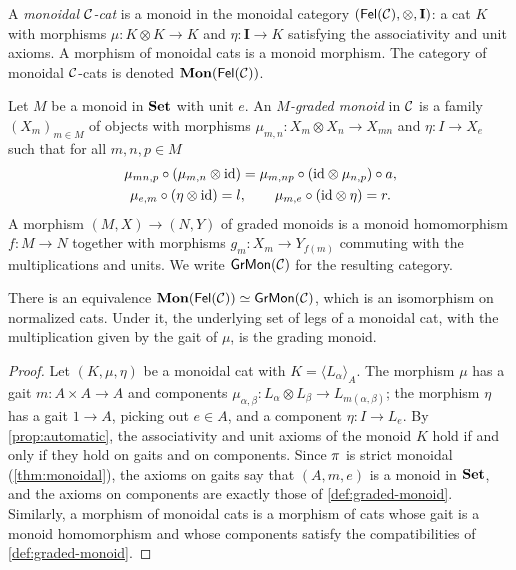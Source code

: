 \begin{definition}\label{def:monoidal-cat}
A \emph{monoidal $\mathcal{C}$-cat} is a monoid in the monoidal category
$(\mathsf{Fel}(\mathcal{C}),\otimes,\mathbf I)$: a cat $K$ with morphisms
$\mu\colon K\otimes K\to K$ and $\eta\colon\mathbf I\to K$ satisfying the
associativity and unit axioms. A morphism of monoidal cats is a monoid
morphism. The category of monoidal $\mathcal{C}$-cats is denoted $\mathbf{Mon}(\mathsf{Fel}(\mathcal{C}))$.
\end{definition}

\begin{definition}\label{def:graded-monoid}
Let $M$ be a monoid in $\mathbf{Set}$ with unit $e$. An \emph{$M$-graded monoid} in
$\mathcal{C}$ is a family $(X_m)_{m\in M}$ of objects with morphisms
$\mu_{m,n}\colon X_m\otimes X_n\to X_{mn}$ and $\eta\colon I\to X_e$ such that
for all $m,n,p\in M$
\begin{gather*}
\mu_{mn,p}\circ(\mu_{m,n}\otimes\mathrm{id})=\mu_{m,np}\circ(\mathrm{id}\otimes\mu_{n,p})\circ a,\\
\mu_{e,m}\circ(\eta\otimes\mathrm{id})=l,\qquad\mu_{m,e}\circ(\mathrm{id}\otimes\eta)=r.
\end{gather*}
A morphism $(M,X)\to(N,Y)$ of graded monoids is a monoid homomorphism
$f\colon M\to N$ together with morphisms $g_m\colon X_m\to Y_{f(m)}$ commuting with
the multiplications and units. We write $\mathsf{GrMon}(\mathcal{C})$ for the resulting category.
\end{definition}

\begin{theorem}\label{thm:graded-monoids}
There is an equivalence $\mathbf{Mon}(\mathsf{Fel}(\mathcal{C}))\simeq\mathsf{GrMon}(\mathcal{C})$, which is an
isomorphism on normalized cats. Under it, the underlying set of legs of a
monoidal cat, with the multiplication given by the gait of $\mu$, is the
grading monoid.
\end{theorem}

\begin{proof}
Let $(K,\mu,\eta)$ be a monoidal cat with $K=\langle L_\alpha\rangle_A$. The
morphism $\mu$ has a gait $m\colon A\times A\to A$ and components
$\mu_{\alpha,\beta}\colon L_\alpha\otimes L_\beta\to L_{m(\alpha,\beta)}$; the
morphism $\eta$ has a gait $1\to A$, picking out $e\in A$, and a component
$\eta\colon I\to L_e$. By \cref{prop:automatic}, the associativity and unit
axioms of the monoid $K$ hold if and only if they hold on gaits and on
components. Since $\pi$ is strict monoidal (\cref{thm:monoidal}), the axioms
on gaits say that $(A,m,e)$ is a monoid in $\mathbf{Set}$, and the axioms on components
are exactly those of \cref{def:graded-monoid}. Similarly, a morphism of
monoidal cats is a morphism of cats whose gait is a monoid homomorphism and
whose components satisfy the compatibilities of \cref{def:graded-monoid}.
\end{proof}

